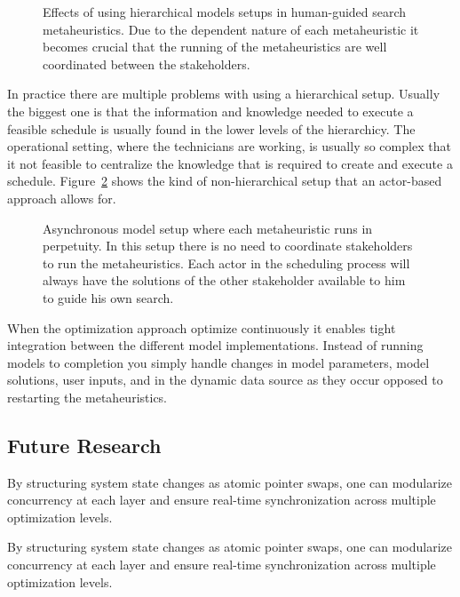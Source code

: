 \begin{figure}[H]
	
	\label{fig:discussion:hierarchical_model_setup}
	\caption{Effects of using hierarchical models setups in human-guided search metaheuristics.
	Due to the dependent nature of each metaheuristic it becomes crucial that the running of 
	the metaheuristics are well coordinated between the stakeholders.}
\end{figure}

In practice there are multiple problems with using a hierarchical setup.
Usually the biggest one is that the information and knowledge needed to 
execute a feasible schedule is usually found in the lower levels of the 
hierarchicy. The operational setting, where the
technicians are working, is usually so complex that it not feasible to 
centralize the knowledge that is required to create and execute a 
schedule. Figure~\ref{fig:discussion:asynchronous_setup}
shows the kind of non-hierarchical setup that an actor-based approach 
allows for.

\begin{figure}[H]
	
	\caption{Asynchronous model setup where each metaheuristic runs in perpetuity. In this setup
	there is no need to coordinate stakeholders to run the metaheuristics. Each actor in the 
	scheduling process will always have the solutions of the other stakeholder available to 
	him to guide his own search.}
	\label{fig:discussion:asynchronous_setup}
\end{figure}

When the optimization approach optimize continuously it enables tight
integration between the different model implementations. Instead of running
models to completion you simply handle changes in model parameters, model
solutions, user inputs, and in the dynamic data source as they occur opposed to
restarting the metaheuristics.

\subsection{Future Research}
By structuring system state changes as atomic pointer swaps, one can modularize
concurrency at each layer and ensure real-time synchronization across multiple
optimization levels.

By structuring system state changes as atomic pointer swaps, one can modularize
concurrency at each layer and ensure real-time synchronization across multiple
optimization levels.


